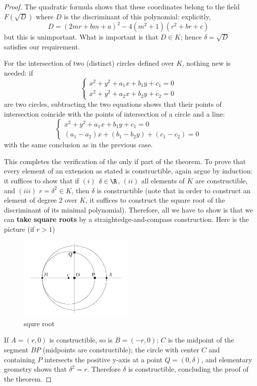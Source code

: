 \begin{proof}
The quadratic formula shows that these coordinates belong to the field $F(\sqrt{D})$ where $D$ is the discriminant of this polynomial: explicitly,
\[D=(2mr+bm+a)^2-4(m^2+1)(r^2+br+c)\]
but this is unimportant. What is important is that $D\in K$; hence $\delta=\sqrt{D}$ satisfies
our requirement.\par
For the intersection of two (distinct) circles defined over $K$, nothing new is needed: if
\[\left\{\begin{array}{l}
x^2+y^2+a_1x+b_1y+c_1=0\\
x^2+y^2+a_2x+b_2y+c_2=0
\end{array}\right. \]
are two circles, subtracting the two equations shows that their points of intersection
coincide with the points of intersection of a circle and a line:
\[\left\{\begin{array}{l}
x^2+y^2+a_1x+b_1y+c_1=0\\
(a_1-a_2)x+(b_1-b_2y)+(c_1-c_2)=0
\end{array}\right. \]
with the same conclusion as in the previous case.\par
This completes the verification of the only if part of the theorem. To prove that every element of an extension as stated is constructible, again argue by induction: it suffices to show that if $(i)$ $\delta\in\R$, $(ii)$ all elements of $K$ are constructible, and $(iii)$ $r=\delta^2\in K$, then $\delta$ is constructible (note that in order to construct an element of degree $2$ over $K$, it suffices to construct the square root of the discriminant of its minimal polynomial). Therefore, all we have to show is that we can \textbf{take square roots} by a straightedge-and-compass construction. Here is the picture (if $r>1$)
\begin{figure}[htbp]
\centering
\includegraphics[width=0.5\textwidth]{pictures/squreroot.pdf}
\caption{squre root}
\end{figure}
If $A=(r,0)$ is constructible, so is $B=(-r, 0)$; $C$ is the midpoint of the segment $BP$ (midpoints are constructible); the circle with center $C$ and containing $P$ intersects the positive y-axis at a point $Q=(0,\delta)$, and elementary geometry shows that $\delta^2=r$. Therefore $\delta$ is constructible, concluding the proof of the theorem.
\end{proof}
